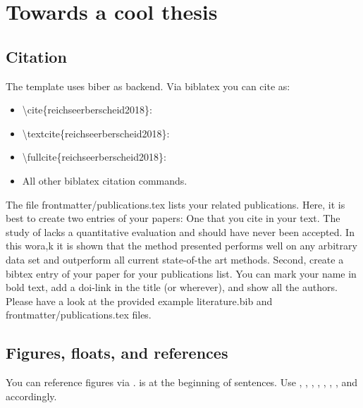 \section{Towards a cool thesis}
\label{sec:towardsacoolthesis}



\subsection{Citation}

The template uses biber as backend.
Via biblatex you can cite as:

\begin{itemize}
  \item \textbackslash cite\{reichseerberscheid2018\}: \cite{reichseerberscheid2018}
  \item \textbackslash textcite\{reichseerberscheid2018\}: \textcite{reichseerberscheid2018}
  \item \textbackslash fullcite\{reichseerberscheid2018\}: 
  \item All other biblatex citation commands.
\end{itemize}

The file frontmatter/publications.tex lists your related publications.
Here, it is best to create two entries of your papers: One that you cite in your text.
\Eg The study of \cite{reichseerberscheid2018} lacks a quantitative evaluation and should have never been accepted.
In this wora,k it is shown that the method presented performs well on any arbitrary data set and outperform all current state-of-the art methods.
Second, create a bibtex entry of your paper for your publications list.
You can mark your name in bold text, add a doi-link in the title (or wherever), and show all the authors.
Please have a look at the provided example literature.bib and frontmatter/publications.tex files.



\subsection{Figures, floats, and references}

You can reference figures via .
 is at the beginning of sentences.
Use \tabref{}, \Tabref{}, \eqnref{}, \Eqnref{}, \secref{}, \Secref{}, \charef{}, and \Charef{} accordingly.

